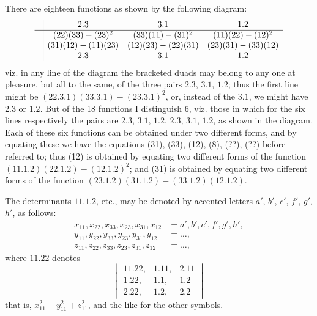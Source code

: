 \documentclass[11pt,a4paper]{article}
\theoremstyle{definition}
\theoremstyle{remark}
\begin{document}
There are eighteen functions as shown by the following diagram:
\[
\begin{array}{c|ccc}
& 2.3 & 3.1 & 1.2 \\ \hline
& (22)(33)-(23)^2 & (33)(11)-(31)^2 & (11)(22)-(12)^2 \\
& (31)(12)-(11)(23) & (12)(23)-(22)(31) & (23)(31)-(33)(12) \\
& 2.3 & 3.1 & 1.2
\end{array}
\]
viz. in any line of the diagram the bracketed duads may belong to any one at pleasure, but all to the same, of the three pairs $2.3$, $3.1$, $1.2$; thus the first line might be $(22.3.1)(33.3.1) - (23.3.1)^2$, or, instead of the $3.1$, we might have $2.3$ or $1.2$. But of the 18 functions I distinguish 6, viz. those in which for the six lines respectively the pairs are $2.3$, $3.1$, $1.2$, $2.3$, $3.1$, $1.2$, as shown in the diagram. Each of these six functions can be obtained under two different forms, and by equating these we have the equations (31), (33), (12), (8), (??), (??) before referred to; thus (12) is obtained by equating two different forms of the function $(11.1.2)(22.1.2) - (12.1.2)^2$; and (31) is obtained by equating two different forms of the function $(23.1.2)(31.1.2) - (33.1.2)(12.1.2)$.

The determinants $11.1.2$, etc., may be denoted by accented letters $a'$, $b'$, $c'$, $f'$, $g'$, $h'$, as follows:
\[
\begin{aligned}
x_{11}, x_{22}, x_{33}, x_{23}, x_{31}, x_{12} &= a', b', c', f', g', h', \\
y_{11}, y_{22}, y_{33}, y_{23}, y_{31}, y_{12} &= \ldots, \\
z_{11}, z_{22}, z_{33}, z_{23}, z_{31}, z_{12} &= \ldots,
\end{aligned}
\]
where $11.22$ denotes
\[
\begin{vmatrix}
11.22, & 1.11, & 2.11 \\
1.22, & 1.1, & 1.2 \\
2.22, & 1.2, & 2.2
\end{vmatrix}
\]
that is, $x_{11}^2 + y_{11}^2 + z_{11}^2$, and the like for the other symbols.
\end{document}
